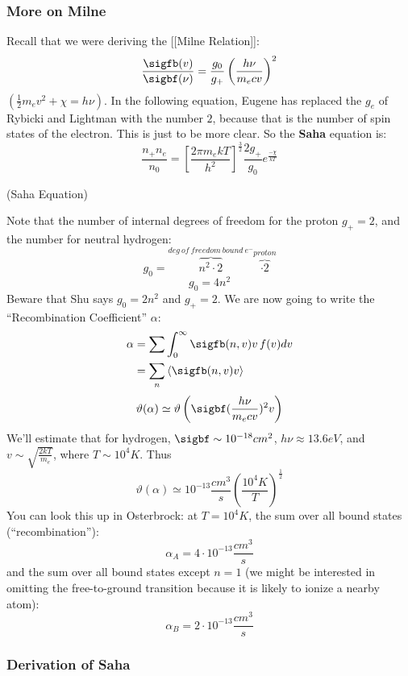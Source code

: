 \documentclass{article}
\def\hf{\frac12}
\def\mean#1{\left\langle {#1}\right\rangle}
\def\e#1{\cdot10^{#1}}
\def\hf{\frac12}
\begin{document}
\subsubsection{More on Milne }
Recall that we were deriving the [[Milne Relation]]:
$$\frac{\sigfb(v)}{\sigbf(\nu)}=\frac{g_0}{ g_+}\left(\frac{h\nu}{ m_ecv}\right)^2$$
$(\hf m_ev^2+\chi=h\nu)$.  In the following equation, Eugene has replaced
the $g_e$ of Rybicki and Lightman with the number $2$, because that is the
number of spin states of the electron.  This is just to be more clear.  So
the {\bf Saha} equation is:
$$\frac{n_+n_e}{ n_0}=\left[\frac{2\pi m_ekT}{ h^2}\right]^\frac{3}{2}\frac{2g_+}{
g_0}e^\frac{-\chi}{ kT}$$
\centerline{(Saha Equation)}
Note that the number of internal degrees of freedom for the proton $g_+=2$, and
the number for neutral hydrogen:
$$g_0=\overbrace{n^2\cdot2}^{deg\ of\ freedom\ bound\ e^-}\overbrace{\cdot2}
^{proton}$$
$$g_0=4n^2$$
Beware that Shu says $g_0=2n^2$ and $g_+=2$.  We are now going to write the
``Recombination Coefficient'' $\alpha$:
$$\begin{aligned}\alpha&=\sum{\int_0^\infty{\sigfb(n,v)v\,f(v)dv}}\\ 
&=\sum_n{\mean{\sigfb(n,v)v}}\\ \end{aligned}$$
$$\vartheta(\alpha)\simeq\vartheta\left(\sigbf(\frac{h\nu}{ m_ecv})^2v\right)$$
We'll estimate that for hydrogen, $\sigbf\sim10^{-18} cm^2$, $h\nu\approx
13.6eV$, and $v\sim\sqrt{\frac{2kT}{ m_e}}$, where $T\sim10^4K$.  Thus
$$\vartheta(\alpha)\simeq10^{-13}\frac{cm^3}{ s}\left(\frac{10^4K}{ T}\right)^\hf$$
You can look this up in Osterbrock: at $T=10^4K$, the sum over all bound
states (``recombination''):
$$\alpha_A=4\e{-13}\frac{cm^3}{ s}$$
and the sum over all bound states except $n=1$ (we might be interested in
omitting the free-to-ground transition because it is likely to ionize
a nearby atom):
$$\alpha_B=2\e{-13}\frac{cm^3}{ s}$$

\subsubsection{ Derivation of Saha}
\end{document}
